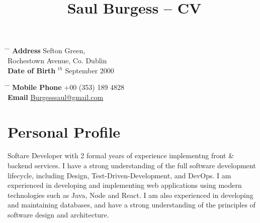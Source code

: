 \documentclass[10pt]{article} %
\begin{document}

\title{Saul Burgess -- CV} %


\parbox{0.5\textwidth}{ %
    \begin{tabbing} %
        \hspace{3cm} \= \hspace{4cm} \= \kill %
        {\bf Address}  Sefton Green,\\ %
        \> Rochestown Avenue, Co. Dublin \\ %
        {\bf Date of Birth} $^{th}$ September 2000 \\ %
    \end{tabbing}}
\hfill %
\parbox{0.5\textwidth}{ %
    \begin{tabbing} %
        \hspace{3cm} \= \hspace{4cm} \= \kill %
        {\bf Mobile Phone} \> +00 (353) 189 4828 \\ %
        {\bf Email} \> \href{mailto:Burgesssaul@gmail.com}{Burgesssaul@gmail.com} \\ %
    \end{tabbing}}


\section{Personal Profile}

Softare Developer with 2 formal years of experience implementng front \& backend services. I have a strong understanding of the full software development lifecycle, including Design, Test-Driven-Development, and DevOps. I am experienced in developing and implementing web applications using modern technologies such as Java, Node and React. I am also experienced in developing and maintaining databases, and have a strong understanding of the principles of software design and architecture.
\end{document}
